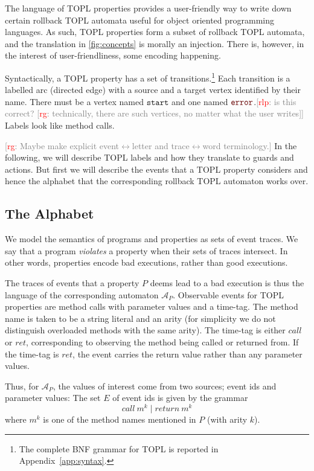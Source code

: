 \documentclass[9pt, preprint]{sigplanconf} %
\newcommand{\noterg}[2]{\textcolor{gray}{[\textcolor{red}{#1}: #2]}}
\newcommand{\rg}[1]{\noterg{rg}{#1}}
\newcommand{\rlp}[1]{\noterg{rlp}{#1}}
\newcommand{\A}{\ensuremath{\mathcal{A}}}
\newcommand{\error}{\ensuremath{\textcolor{darkred}{\mathtt{error}}}\xspace}
\newcommand{\start}{\ensuremath{\mathtt{start}}\xspace}
\theoremstyle{definition}
\theoremstyle{remark}
\begin{document}
The language of TOPL properties provides a user-friendly way to write down certain
rollback TOPL automata useful for object oriented programming
languages. As such, TOPL properties form a subset of rollback TOPL
automata, and the translation in \autoref{fig:concepts} is morally an
injection. There is, however, in the interest of user-friendliness,
some encoding happening.

Syntactically, a TOPL property has a set of transitions.\footnote{The complete BNF grammar for TOPL is reported in Appendix~\ref{app:syntax}.}
Each transition is a labelled arc (directed edge) with a source and a
target vertex identified by their name.
There must be a vertex named \start and one named \error.\rlp{is
this correct? \rg{technically, there are such vertices, no matter what the user writes}}
Labels look like method calls.

\rg{Maybe make explicit event$\leftrightarrow$letter and trace$\leftrightarrow$word terminology.}
In the following, we will describe TOPL labels and how they translate to guards
and actions. But first we will describe the events that a TOPL
property considers and hence the alphabet that the corresponding
rollback TOPL automaton works over.

\subsection{The Alphabet}

We model the semantics of programs and properties as sets of event
traces. We say that a program \emph{violates} a property when their sets of traces intersect.
In other words, properties encode bad executions, rather than good executions.

The traces of events that a property $P$ deems lead to a bad execution is thus the language
of the corresponding automaton $\A_P$. Observable events for TOPL properties are method calls
with parameter values and a time-tag. The method name is taken to be a
string literal and an arity (for simplicity we do not distinguish
overloaded methods with the same arity). The time-tag is either $call$ or $ret$,
corresponding to observing the method being called or returned
from. If the time-tag is $ret$, the event carries the return value
rather than any parameter values.

Thus, for $\A_P$, the values of interest come from two
sources; event ids and parameter values: The set $E$ of event ids is given by
the grammar
\[
call\ m^k \mid return\ m^k
\]
where $m^k$ is one of the method names mentioned in $P$ (with arity $k$).
\end{document}
